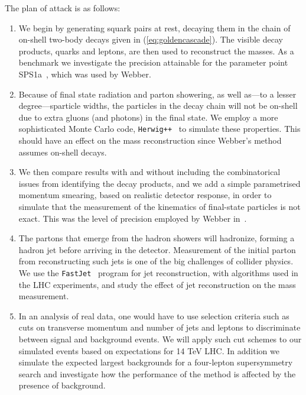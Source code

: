 \documentclass[twoside,english]{uiofysmaster}
\begin{document}
The plan of attack is as follows:
\begin{enumerate}
	\item We begin by generating squark pairs at rest, decaying them in the chain of on-shell two-body decays given in (\ref{eq:goldencascade}). The visible decay products, quarks and leptons, are then used to reconstruct the masses. As a benchmark we investigate the precision attainable for the parameter point SPS1a~\cite{Allanach:2002nj}, which was used by Webber. 
	\item Because of final state radiation and parton showering, as well as---to a lesser degree---sparticle widths, the particles in the decay chain will not be on-shell due to extra gluons (and photons) in the final state. We employ a more sophisticated Monte Carlo code, {\tt Herwig++}~\cite{Bahr:2008pv}  to simulate these properties. This should have an effect on the mass reconstruction since Webber's method assumes on-shell decays.
	\item	We then compare results with and without including the combinatorical issues from identifying the decay products, and we add a simple parametrised momentum smearing, based on realistic detector response, in order to simulate that the measurement of the kinematics of final-state particles is not exact. This was the level of precision employed by Webber in~\cite{Webber:2009vm}.
	\item The partons that emerge from the hadron showers will hadronize, forming a hadron jet before arriving in the detector. Measurement of the initial parton from reconstructing such jets is one of the big challenges of collider physics. We use the {\tt FastJet}~\cite{Cacciari:2011ma} program for jet reconstruction, with algorithms used in the LHC experiments, and study the effect of jet reconstruction on the mass measurement.
	\item In an analysis of real data, one would have to use selection criteria such as cuts on transverse momentum and number of jets and leptons to discriminate between signal and background events. We will apply such cut schemes to our simulated events based on expectations for 14 TeV LHC. In addition we simulate the expected largest backgrounds for a four-lepton supersymmetry search and investigate how the performance of the method is affected by the presence of background.

\end{enumerate}
\end{document}
